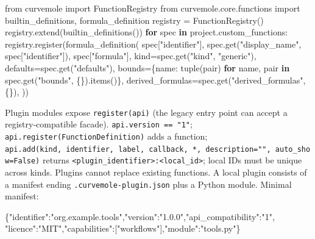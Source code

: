 \documentclass[
  10pt,
  a4paper,
  oneside]{scrreprt}
\newenvironment{Shaded}{}{}
\newcommand{\BuiltInTok}[1]{#1}
\newcommand{\ControlFlowTok}[1]{\textcolor[rgb]{0.00,0.44,0.13}{\textbf{#1}}}
\newcommand{\DataTypeTok}[1]{\textcolor[rgb]{0.56,0.13,0.00}{#1}}
\newcommand{\FunctionTok}[1]{\textcolor[rgb]{0.02,0.16,0.49}{#1}}
\newcommand{\ImportTok}[1]{#1}
\newcommand{\KeywordTok}[1]{\textcolor[rgb]{0.00,0.44,0.13}{\textbf{#1}}}
\newcommand{\NormalTok}[1]{#1}
\newcommand{\OperatorTok}[1]{\textcolor[rgb]{0.40,0.40,0.40}{#1}}
\newcommand{\OtherTok}[1]{\textcolor[rgb]{0.00,0.44,0.13}{#1}}
\newcommand{\StringTok}[1]{\textcolor[rgb]{0.25,0.44,0.63}{#1}}
\begin{document}
\begin{Shaded}
\begin{Highlighting}[]
\ImportTok{from}\NormalTok{ curvemole }\ImportTok{import}\NormalTok{ FunctionRegistry}
\ImportTok{from}\NormalTok{ curvemole.core.functions }\ImportTok{import}\NormalTok{ builtin\_definitions, formula\_definition}
\NormalTok{registry }\OperatorTok{=}\NormalTok{ FunctionRegistry()}
\NormalTok{registry.extend(builtin\_definitions())}
\ControlFlowTok{for}\NormalTok{ spec }\KeywordTok{in}\NormalTok{ project.custom\_functions:}
\NormalTok{    registry.register(formula\_definition(}
\NormalTok{        spec[}\StringTok{"identifier"}\NormalTok{], spec.get(}\StringTok{"display\_name"}\NormalTok{, spec[}\StringTok{"identifier"}\NormalTok{]), spec[}\StringTok{"formula"}\NormalTok{],}
\NormalTok{        kind}\OperatorTok{=}\NormalTok{spec.get(}\StringTok{"kind"}\NormalTok{, }\StringTok{"generic"}\NormalTok{), defaults}\OperatorTok{=}\NormalTok{spec.get(}\StringTok{"defaults"}\NormalTok{),}
\NormalTok{        bounds}\OperatorTok{=}\NormalTok{\{name: }\BuiltInTok{tuple}\NormalTok{(pair) }\ControlFlowTok{for}\NormalTok{ name, pair }\KeywordTok{in}\NormalTok{ spec.get(}\StringTok{"bounds"}\NormalTok{, \{\}).items()\},}
\NormalTok{        derived\_formulas}\OperatorTok{=}\NormalTok{spec.get(}\StringTok{"derived\_formulas"}\NormalTok{, \{\}),}
\NormalTok{    ))}
\end{Highlighting}
\end{Shaded}

Plugin modules expose \texttt{register(api)} (the legacy entry point can
accept a registry-compatible facade). \texttt{api.version\ ==\ "1"};
\texttt{api.register(FunctionDefinition)} adds a function;
\texttt{api.add(kind,\ identifier,\ label,\ callback,\ *,\ description="",\ auto\_show=False)}
returns
\texttt{\textless{}plugin\_identifier\textgreater{}:\textless{}local\_id\textgreater{}};
local IDs must be unique across kinds. Plugins cannot replace existing
functions. A local plugin consists of a manifest ending
\texttt{.curvemole-plugin.json} plus a Python module. Minimal manifest:

\begin{Shaded}
\begin{Highlighting}[]
\FunctionTok{\{}\DataTypeTok{"identifier"}\FunctionTok{:}\StringTok{"org.example.tools"}\FunctionTok{,}\DataTypeTok{"version"}\FunctionTok{:}\StringTok{"1.0.0"}\FunctionTok{,}\DataTypeTok{"api\_compatibility"}\FunctionTok{:}\StringTok{"1"}\FunctionTok{,}
 \DataTypeTok{"licence"}\FunctionTok{:}\StringTok{"MIT"}\FunctionTok{,}\DataTypeTok{"capabilities"}\FunctionTok{:}\OtherTok{[}\StringTok{"workflows"}\OtherTok{]}\FunctionTok{,}\DataTypeTok{"module"}\FunctionTok{:}\StringTok{"tools.py"}\FunctionTok{\}}
\end{Highlighting}
\end{Shaded}
\end{document}
